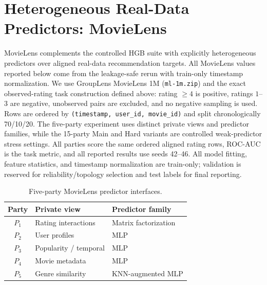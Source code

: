 \documentclass[letterpaper]{article}
\begin{document}
\section{Heterogeneous Real-Data Predictors: MovieLens}
\label{sec:supp-movielens}

MovieLens complements the controlled HGB suite with explicitly heterogeneous
predictors over aligned real-data recommendation targets. All MovieLens values
reported below come from the leakage-safe rerun with train-only timestamp
normalization. We use GroupLens
MovieLens 1M (\texttt{ml-1m.zip}) and the exact observed-rating task construction
defined above: rating $\ge4$ is positive, ratings $1$--$3$ are negative,
unobserved pairs are excluded, and no negative sampling is used. Rows are
ordered by \texttt{(timestamp, user\_id, movie\_id)} and split chronologically
70/10/20. The five-party experiment uses distinct private views and predictor
families, while the 15-party Main and Hard variants are controlled weak-predictor
stress settings. All parties score the same ordered aligned rating rows,
ROC-AUC is the task metric, and all reported results use seeds 42--46. All
model fitting, feature statistics, and timestamp normalization are train-only;
validation is reserved for reliability/topology selection and test labels for
final reporting.

\begin{table}[!t]
\centering
\footnotesize
\setlength{\tabcolsep}{3.5pt}
\caption{Five-party MovieLens predictor interfaces.}
\label{tab:supp-movielens-interfaces}
\begin{tabular}{cll}
\toprule
Party & Private view & Predictor family \\
\midrule
$P_1$ & Rating interactions & Matrix factorization \\
$P_2$ & User profiles & MLP \\
$P_3$ & Popularity / temporal & MLP \\
$P_4$ & Movie metadata & MLP \\
$P_5$ & Genre similarity & KNN-augmented MLP \\
\bottomrule
\end{tabular}
\end{table}
\end{document}
